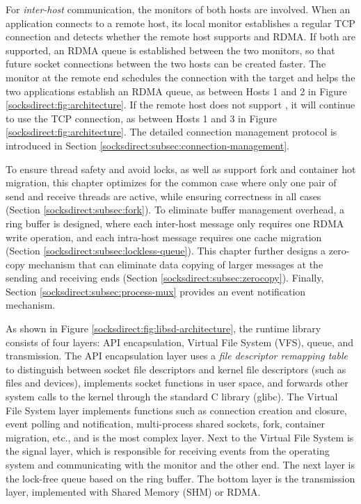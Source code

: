 For \emph{inter-host} communication, the monitors of both hosts are involved. When an application connects to a remote host, its local monitor establishes a regular TCP connection and detects whether the remote host supports \sys{} and RDMA. If both are supported, an RDMA queue is established between the two monitors, so that future socket connections between the two hosts can be created faster. The monitor at the remote end schedules the connection with the target and helps the two applications establish an RDMA queue, as between Hosts 1 and 2 in Figure \ref{socksdirect:fig:architecture}. If the remote host does not support \sys{}, it will continue to use the TCP connection, as between Hosts 1 and 3 in Figure \ref{socksdirect:fig:architecture}. The detailed connection management protocol is introduced in Section \ref{socksdirect:subsec:connection-management}.

To ensure thread safety and avoid locks, as well as support fork and container hot migration, this chapter optimizes for the common case where only one pair of send and receive threads are active, while ensuring correctness in all cases (Section \ref{socksdirect:subsec:fork}). To eliminate buffer management overhead, a ring buffer is designed, where each inter-host message only requires one RDMA write operation, and each intra-host message requires one cache migration (Section \ref{socksdirect:subsec:lockless-queue}). This chapter further designs a zero-copy mechanism that can eliminate data copying of larger messages at the sending and receiving ends (Section \ref{socksdirect:subsec:zerocopy}). Finally, Section \ref{socksdirect:subsec:process-mux} provides an event notification mechanism.

As shown in Figure \ref{socksdirect:fig:libsd-architecture}, the \libipc{} runtime library consists of four layers: API encapsulation, Virtual File System (VFS), queue, and transmission. The API encapsulation layer uses a \emph{file descriptor remapping table} to distinguish between socket file descriptors and kernel file descriptors (such as files and devices), implements socket functions in user space, and forwards other system calls to the kernel through the standard C library (glibc). The Virtual File System layer implements functions such as connection creation and closure, event polling and notification, multi-process shared sockets, fork, container migration, etc., and is the most complex layer. Next to the Virtual File System is the signal layer, which is responsible for receiving events from the operating system and communicating with the monitor and the other end. The next layer is the lock-free queue based on the ring buffer. The bottom layer is the transmission layer, implemented with Shared Memory (SHM) or RDMA.

